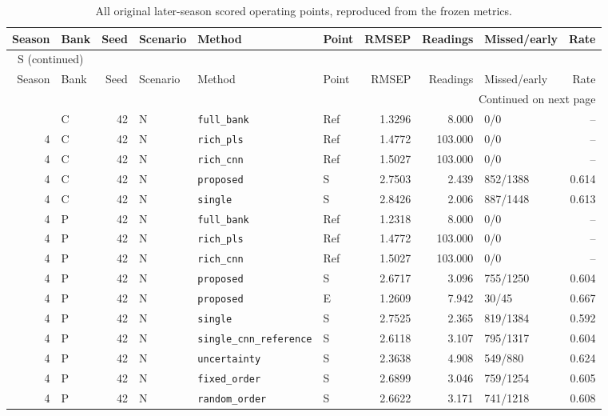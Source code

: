 \documentclass[10pt,a4paper]{article}
\renewcommand{\thetable}{S\arabic{table}}
\begin{document}
\clearpage
\begin{landscape}
\begingroup\footnotesize
\setlength{\tabcolsep}{3.5pt}
\renewcommand{\arraystretch}{1.10}
\begin{longtable}{rlrlllrrlr}
\caption{All original later-season scored operating points, reproduced from the frozen metrics.}\label{tab:original}\\
\toprule
Season & Bank & Seed & Scenario & Method & Point & RMSEP & Readings & Missed/early & Rate \\
\midrule
\endfirsthead
\multicolumn{10}{l}{\tablename~\thetable{} (continued)}\\
\toprule
Season & Bank & Seed & Scenario & Method & Point & RMSEP & Readings & Missed/early & Rate \\
\midrule
\endhead
\midrule
\multicolumn{10}{r}{Continued on next page}\\
\endfoot
\bottomrule
\endlastfoot
4 & C & 42 & N & \texttt{full\_bank} & Ref & 1.3296 & 8.000 & 0/0 & -- \\
4 & C & 42 & N & \texttt{rich\_pls} & Ref & 1.4772 & 103.000 & 0/0 & -- \\
4 & C & 42 & N & \texttt{rich\_cnn} & Ref & 1.5027 & 103.000 & 0/0 & -- \\
4 & C & 42 & N & \texttt{proposed} & S & 2.7503 & 2.439 & 852/1388 & 0.614 \\
4 & C & 42 & N & \texttt{single} & S & 2.8426 & 2.006 & 887/1448 & 0.613 \\
4 & P & 42 & N & \texttt{full\_bank} & Ref & 1.2318 & 8.000 & 0/0 & -- \\
4 & P & 42 & N & \texttt{rich\_pls} & Ref & 1.4772 & 103.000 & 0/0 & -- \\
4 & P & 42 & N & \texttt{rich\_cnn} & Ref & 1.5027 & 103.000 & 0/0 & -- \\
4 & P & 42 & N & \texttt{proposed} & S & 2.6717 & 3.096 & 755/1250 & 0.604 \\
4 & P & 42 & N & \texttt{proposed} & E & 1.2609 & 7.942 & 30/45 & 0.667 \\
4 & P & 42 & N & \texttt{single} & S & 2.7525 & 2.365 & 819/1384 & 0.592 \\
4 & P & 42 & N & \texttt{single\_cnn\_reference} & S & 2.6118 & 3.107 & 795/1317 & 0.604 \\
4 & P & 42 & N & \texttt{uncertainty} & S & 2.3638 & 4.908 & 549/880 & 0.624 \\
4 & P & 42 & N & \texttt{fixed\_order} & S & 2.6899 & 3.046 & 759/1254 & 0.605 \\
4 & P & 42 & N & \texttt{random\_order} & S & 2.6622 & 3.171 & 741/1218 & 0.608 \\

\end{longtable}
\end{landscape}
\end{document}
